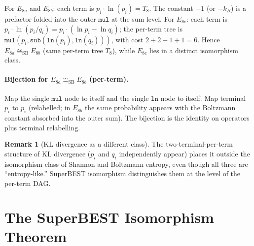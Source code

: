 \documentclass[12pt,a4paper]{article}
\theoremstyle{definition}
\newtheorem{remark}[theorem]{Remark}
\newcommand{\mmul}{\mathtt{mul}}
\newcommand{\msub}{\mathtt{sub}}
\newcommand{\mln}{\mathtt{ln}}
\newcommand{\siso}{\cong_{\mathrm{SB}}}
\begin{document}
For $E_{8a}$ and $E_{8b}$: each term is $p_i \cdot \ln(p_i) = T_8$.
The constant $-1$ (or $-k_B$) is a prefactor folded into the outer
$\mmul$ at the sum level.  For $E_{8c}$: each term is
$p_i \cdot \ln(p_i / q_i) = p_i \cdot (\ln p_i - \ln q_i)$; the per-term
tree is $\mmul(p_i, \msub(\mln(p_i), \mln(q_i)))$, with cost
$2 + 2 + 1 + 1 = 6$.  Hence $E_{8a} \siso E_{8b}$ (same per-term tree $T_8$),
while $E_{8c}$ lies in a distinct isomorphism class.

\paragraph{Bijection for $E_{8a} \siso E_{8b}$ (per-term).}
Map the single $\mmul$ node to itself and the single $\mln$ node to itself.
Map terminal $p_i$ to $p_i$ (relabelled; in $E_{8b}$ the same probability
appears with the Boltzmann constant absorbed into the outer sum).  The bijection
is the identity on operators plus terminal relabelling.

\begin{remark}[KL divergence as a different class]
The two-terminal-per-term structure of KL divergence ($p_i$ and $q_i$
independently appear) places it outside the isomorphism class of Shannon and
Boltzmann entropy, even though all three are ``entropy-like.''  SuperBEST
isomorphism distinguishes them at the level of the per-term DAG.
\end{remark}

\section{The SuperBEST Isomorphism Theorem}
\label{sec:theorem}
\end{document}

